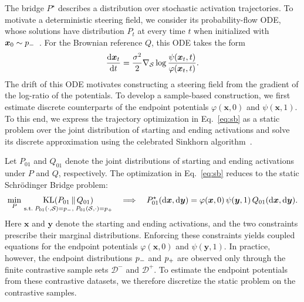 The bridge $P^\star$ describes a distribution over stochastic activation trajectories. To motivate a deterministic steering field, we consider its probability-flow ODE, whose solutions have distribution $P_t$ at every time $t$ when initialized with $\boldsymbol{x}_0\sim p_{-}$~\citep{song2020score, de2022riemannian}. For the Brownian reference $Q$, this ODE takes the form
\begin{equation}
\displaystyle
\frac{\mathrm{d}\boldsymbol{x}_t}{\mathrm{d}t}
=
\frac{\sigma^2}{2}\nabla_{\mathcal{S}}
\log\frac{\psi(\boldsymbol{x}_t,t)}
{\varphi(\boldsymbol{x}_t,t)}.
\label{eq:ldr}
\end{equation}
The drift of this ODE motivates constructing a steering field from the gradient of the log-ratio of the potentials. To develop a sample-based construction, we first estimate discrete counterparts of the endpoint potentials $\varphi(\boldsymbol{x},0)$ and $\psi(\boldsymbol{x},1)$. To this end, we express the trajectory optimization in Eq.~\eqref{eq:sb} as a static problem over the joint distribution of starting and ending activations and solve its discrete approximation using the celebrated Sinkhorn algorithm~\citep{cuturi2013sinkhorn}.

Let $P_{01}$ and $Q_{01}$ denote the joint distributions of
starting and ending activations under $P$ and $Q$, respectively.
The optimization in Eq.~\eqref{eq:sb} reduces to the static
Schr\"{o}dinger Bridge problem:
\begin{equation}
\displaystyle
\min_{P}\,
\underset{\text{s.t.}\;P_{01}(\cdot,\mathcal{S})=p_{-},\;P_{01}(\mathcal{S},\cdot)=p_{+}}
{\mathrm{KL}(P_{01}\,\Vert\,Q_{01})}
\quad\Longrightarrow\quad
P^\star_{01}(\mathrm{d}\boldsymbol{x},\mathrm{d}\boldsymbol{y})
=
\varphi(\boldsymbol{x},0)\,
\psi(\boldsymbol{y},1)\,
Q_{01}(\mathrm{d}\boldsymbol{x},\mathrm{d}\boldsymbol{y}).
\label{eq:static-sb}
\end{equation}
Here $\boldsymbol{x}$ and $\boldsymbol{y}$ denote the starting
and ending activations, and the two constraints prescribe
their marginal distributions. Enforcing these constraints
yields coupled equations for the endpoint potentials
$\varphi(\boldsymbol{x},0)$ and $\psi(\boldsymbol{y},1)$.
In practice, however, the endpoint distributions $p_{-}$ and
$p_{+}$ are observed only through the finite contrastive sample
sets $\mathcal{D}^-$ and $\mathcal{D}^+$. To estimate the endpoint
potentials from these contrastive datasets, we therefore discretize the static
problem on the contrastive samples.

